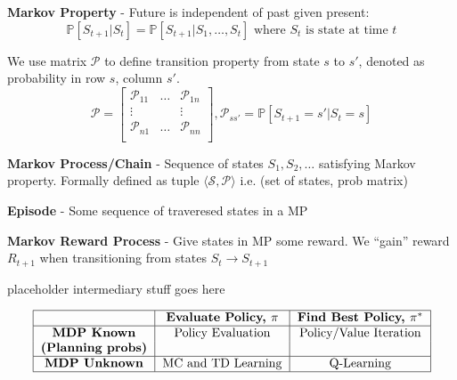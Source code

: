 \documentclass[a4paper,10pt,twocolumn]{article}
\begin{document}
\begin{tcolorbox}[title={Reinforcement Learning}, module]
    \textbf{Markov Property} - Future is independent of past given present:
    \[
        \mathbb{P}[S_{t + 1} | S_t] = \mathbb{P}[S_{t + 1} | S_1, \ldots, S_t] \text{ where } S_t \text{ is state at time } t
    \]

    We use matrix $\mathcal{P}$ to define transition property from state $s$ to $s'$, denoted as probability in row $s$, column $s'$.
    \[
        \mathcal{P} =
        \begin{bmatrix}
            \mathcal{P}_{11} & \ldots & \mathcal{P}_{1n} \\
            \vdots && \vdots \\
            \mathcal{P}_{n1} & \ldots & \mathcal{P}_{nn} \\
        \end{bmatrix}
        , \mathcal{P}_{ss'} = \mathbb{P}[S_{t+1} = s' | S_t = s]
    \]

    \textbf{Markov Process/Chain} - Sequence of states $S_1, S_2, \ldots$ satisfying Markov property. Formally defined as tuple $\langle \mathcal{S}, \mathcal{P} \rangle$ i.e. (set of states, prob matrix)

    \textbf{Episode} - Some sequence of traveresed states in a MP

    \textbf{Markov Reward Process} - Give states in MP some reward. We ``gain'' reward $R_{t + 1}$ when transitioning from states $S_t \to S_{t + 1}$

    placeholder intermediary stuff goes here

    \[
        \begin{tabular}{|c|c|c|}
            \hline
            & \textbf{Evaluate Policy, $\pi$} & \textbf{Find Best Policy, $\pi^*$} \\
            \hline
            \textbf{MDP Known} & Policy Evaluation & Policy/Value Iteration \\
            \textbf{(Planning probs)} && \\
            \hline
            \textbf{MDP Unknown} & MC and TD Learning & Q-Learning \\
            \hline
        \end{tabular}
    \]

\end{tcolorbox}
\end{document}
